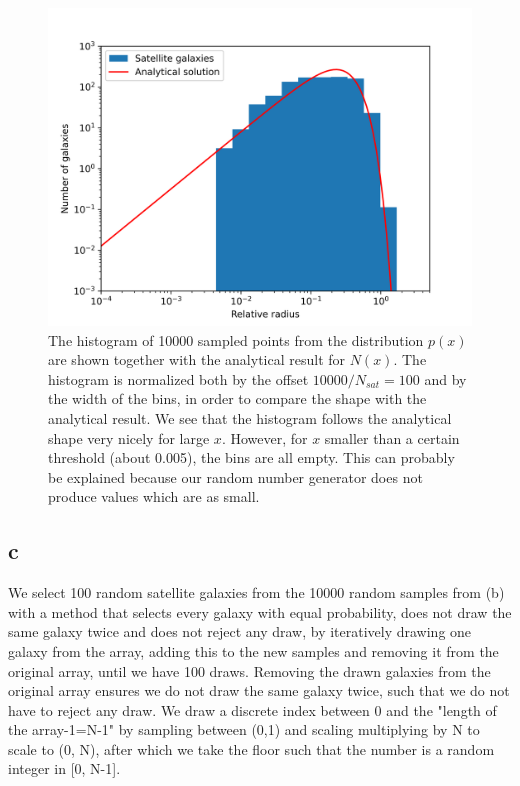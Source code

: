 \begin{figure}[h!]
    \centering
    \includegraphics[width=0.9\linewidth]{./my_solution_1b.png}
    \caption{The histogram of 10000 sampled points from the distribution $p(x)$ are shown together with the analytical result for $N(x)$.
    The histogram is normalized both by the offset $10000/N_{sat}=100$ and by the width of the bins, in order to compare the shape with the
    analytical result. We see that the histogram follows the analytical shape very nicely for large $x$. However, for $x$ smaller than a certain
    threshold (about 0.005), the bins are all empty. This can probably be explained because our random number generator does not produce values
    which are as small.}
    \label{fig:solb}
\end{figure}



\subsection{c}

We select 100 random satellite galaxies from the 10000 random samples from (b) with a method that selects every galaxy with equal probability,
does not draw the same galaxy twice and does not reject any draw, by iteratively drawing one galaxy from the array, adding this to the new samples
and removing it from the original array, until we have 100 draws. Removing the drawn galaxies from the original array ensures we do not draw the same 
galaxy twice, such that we do not have to reject any draw. We draw a discrete index between 0 and the "length of the array-1=N-1" by sampling between (0,1) and scaling
multiplying by N to scale to (0, N), after which we take the floor such that the number is a random integer in [0, N-1].

